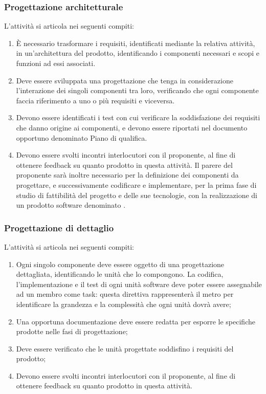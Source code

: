 \subsubsection{Progettazione architetturale}
L'attività si articola nei seguenti compiti:
\begin{enumerate}
    \item È necessario trasformare i requisiti, identificati mediante la relativa attività, in un'architettura del prodotto, identificando i componenti necessari e scopi e funzioni ad essi associati.
    \item Deve essere sviluppata una progettazione che tenga in considerazione l'interazione dei singoli componenti tra loro, verificando che ogni componente faccia riferimento a uno o più requisiti e viceversa.
    \item Devono essere identificati i test con cui verificare la soddisfazione dei requisiti che danno origine ai componenti, e devono essere riportati nel documento opportuno denominato Piano di qualifica.
    \item Devono essere svolti incontri interlocutori con il proponente, al fine di ottenere feedback su quanto prodotto in questa attività. Il parere del proponente sarà inoltre necessario per la definizione dei componenti da progettare, e successivamente codificare e implementare, per la prima fase di studio di fattibilità del progetto e delle sue tecnologie, con la realizzazione di un prodotto software denominato .
\end{enumerate}

\subsubsection{Progettazione di dettaglio}
L'attività si articola nei seguenti compiti:
\begin{enumerate}
    \item Ogni singolo componente deve essere oggetto di una progettazione dettagliata, identificando le unità che lo compongono. La codifica, l'implementazione e il test di ogni unità software deve poter essere assegnabile ad un membro come task: questa direttiva rappresenterà il metro per identificare la grandezza e la complessità che ogni unità dovrà avere;
    \item Una opportuna documentazione deve essere redatta per esporre le specifiche prodotte nelle fasi di progettazione;
    \item Deve essere verificato che le unità progettate soddisfino i requisiti del prodotto;
    \item Devono essere svolti incontri interlocutori con il proponente, al fine di ottenere feedback su quanto prodotto in questa attività.
\end{enumerate}

